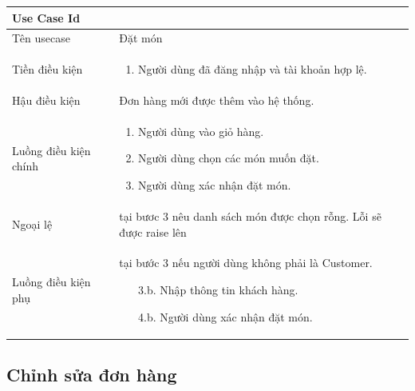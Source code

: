 \begin{center}{\color{black}}

    \begin{tabular}{|p{5cm}|p{7cm}|} 
        \hline
        \textbf{Use Case Id} & \textbf{}  \\ \hline
        Tên usecase &  Đặt món\\ \hline
        Tiền điều kiện &    \begin{enumerate}
            \item Người dùng đã đăng nhập và tài khoản hợp lệ.
        \end{enumerate}\\ \hline
        Hậu điều kiện & Đơn hàng mới được thêm vào hệ thống.\\ \hline
        Luồng điều kiện chính &  
            \begin{enumerate}
                \item Người dùng vào giỏ hàng.
                \item Người dùng chọn các món muốn đặt.
				\item Người dùng xác nhận đặt món.
            \end{enumerate}\\
        \hline
        Ngoại lệ &  tại bươc 3 nêu danh sách món được chọn rỗng. Lỗi sẽ được raise lên\\ \hline
        Luồng điều kiện phụ &  tại bước 3 nếu người dùng không phải là Customer.
        \begin{enumerate}
            \item[3.b.] Nhập thông tin khách hàng.
            \item[4.b.] Người dùng xác nhận đặt món.
        \end{enumerate}\\
        \hline
    \end{tabular}
\end{center}

\newpage
\subsection{Chỉnh sửa đơn hàng}

